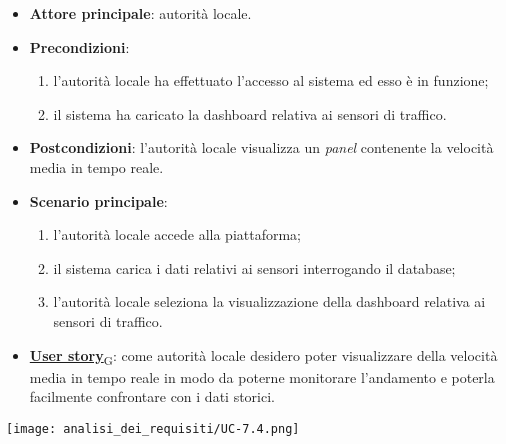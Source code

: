 \begin{itemize}
	\item \textbf{Attore principale}: autorità locale.
	\item \textbf{Precondizioni}:
	      \begin{enumerate}
		      \item l'autorità locale ha effettuato l'accesso al sistema ed esso è in funzione;
		      \item il sistema ha caricato la dashboard relativa ai sensori di traffico.
	      \end{enumerate}
	\item \textbf{Postcondizioni}: l'autorità locale visualizza un \textit{panel} contenente la velocità media in tempo reale.
	\item \textbf{Scenario principale}:
	      \begin{enumerate}
		      \item l'autorità locale accede alla piattaforma;
		      \item il sistema carica i dati relativi ai sensori interrogando il database;
		      \item l'autorità locale seleziona la visualizzazione della dashboard relativa ai sensori di traffico.
	      \end{enumerate}
	\item \href{https://7last.github.io/docs/rtb/documentazione-interna/glossario\#user-story}{\textbf{User story}\textsubscript{G}}:
	      come autorità locale desidero poter visualizzare della velocità media in tempo reale in modo da poterne monitorare l'andamento
	      e poterla facilmente confrontare con i dati storici.
\end{itemize}
\begin{center}
	\texttt{[image: analisi\_dei\_requisiti/UC-7.4.png]}
\end{center}


